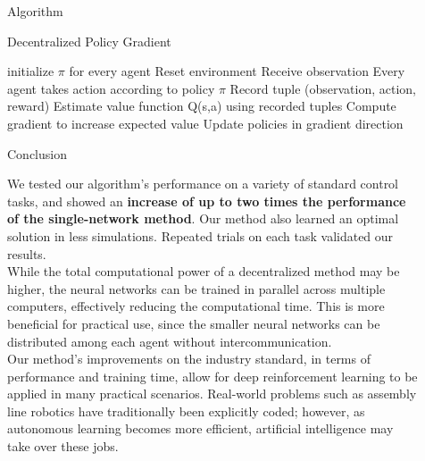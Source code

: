 \documentclass[final]{beamer}
\newlength{\sepwid}
\newlength{\onecolwid}
\newlength{\twocolwid}
\begin{document}
\begin{frame}[t]
\begin{columns}[t]
\begin{column}{\twocolwid}
\end{column} %

\begin{column}{\sepwid}\end{column} %

\begin{column}{\onecolwid} %

\begin{block}{Algorithm}

    \begin{algorithm}[H]
        \caption{Decentralized Policy Gradient}\label{euclid}
        \small
        \begin{algorithmic}[1]
            \State initialize $\pi$ for every agent
                    \State Reset environment
                        \State Receive observation
                        \State Every agent takes action according to policy $\pi$
                        \State Record tuple (observation, action, reward)
                        \EndFor
                \State Estimate value function Q(s,a) using recorded tuples
                \State Compute gradient to increase expected value
                \State Update policies in gradient direction
                \EndFor
            \EndFor

        \end{algorithmic}
    \end{algorithm}

\end{block}

\begin{block}{Conclusion}

We tested our algorithm's performance on a variety of standard control tasks, and showed an \textbf{increase of up to two times the performance of the single-network method}. Our method also learned an optimal solution in less simulations. Repeated trials on each task validated our results. 
\\[12pt]
While the total computational power of a decentralized method may be higher, the neural networks can be trained in parallel across multiple computers, effectively reducing the computational time. This is more beneficial for practical use, since the smaller neural networks can be distributed among each agent without intercommunication.
\\[12pt]
Our method's improvements on the industry standard, in terms of performance and training time, allow for deep reinforcement learning to be applied in many practical scenarios. Real-world problems such as assembly line robotics have traditionally been explicitly coded; however, as autonomous learning becomes more efficient, artificial intelligence may take over these jobs.



\end{block}
\end{column}
\end{columns}
\end{frame}
\end{document}
